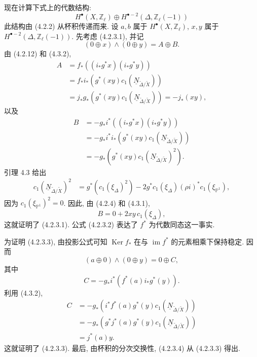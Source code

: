 现在计算下式上的代数结构:
\[
H^\bullet(X,\mathbb Z_\ell)\oplus
H^{\bullet-2}(\Delta,\mathbb Z_\ell(-1))
\]
此结构由 (4.2.2) 从杯积传递而来. 设 $a,b$ 属于 $H^\bullet(X,\mathbb Z_\ell)$, $x,y$ 属于 $H^{\bullet-2}(\Delta,\mathbb Z_\ell(-1))$. 先考虑 (4.2.3.1), 并记
\[
(0\oplus x)\wedge(0\oplus y)=A\oplus B.
\]
由 (4.2.12) 和 (4.3.2),
\[
\begin{aligned}
A
&=f_*\!\left((i_*g^*x)(i_*g^*y)\right)\\
&=f_*i_*\!\left(g^*(xy)c_1(\underline N_{\widetilde\Delta/\widetilde X})\right)\\
&=j_*g_*\!\left(g^*(xy)c_1(\underline N_{\widetilde\Delta/\widetilde X})\right)
=-j_*(xy),
\end{aligned}
\]
以及
\[
\begin{aligned}
B
&=-g_*i^*\!\left((i_*g^*x)(i_*g^*y)\right)\\
&=-g_*i^*i_*\!\left(g^*(xy)c_1(\underline N_{\widetilde\Delta/\widetilde X})\right)\\
&=-g_*\!\left(g^*(xy)c_1(\underline N_{\widetilde\Delta/\widetilde X})^2\right).
\end{aligned}
\]
引理 4.3 给出
\[
\begin{aligned}
c_1(\underline N_{\widetilde\Delta/\widetilde X})^2
&=g^*\!\left(c_1(\xi_\Delta)^2\right)
 -2g^*c_1(\xi_\Delta)(\rho i)^*c_1(\xi_{\mathbb P^1}),
\end{aligned}
\]
因为 $c_1(\xi_{\mathbb P^1})^2=0$. 因此, 由 (4.2.4) 和 (4.3.1),
\[
B=0+2xy\,c_1(\xi_\Delta),
\]
这就证明了 (4.2.3.1). 公式 (4.2.3.2) 表达了 $f^*$ 为代数同态这一事实.

为证明 (4.2.3.3), 由投影公式可知 $\operatorname{Ker}f_*$ 在与 $\operatorname{im}f^*$ 的元素相乘下保持稳定. 因而
\[
(a\oplus0)\wedge(0\oplus y)=0\oplus C,
\]
其中
\begin{equation}\tag{4.3.3}
C=-g_*i^*\!\left(f^*(a)i_*g^*(y)\right).
\end{equation}
利用 (4.3.2),
\[
\begin{aligned}
C
&=-g_*\!\left(i^*f^*(a)g^*(y)
      c_1(\underline N_{\widetilde\Delta/\widetilde X})\right)\\
&=-g_*\!\left(g^*j^*(a)g^*(y)
      c_1(\underline N_{\widetilde\Delta/\widetilde X})\right)\\
&=j^*(a)y.
\end{aligned}
\]
这就证明了 (4.2.3.3). 最后, 由杯积的分次交换性, (4.2.3.4) 从 (4.2.3.3) 得出.
